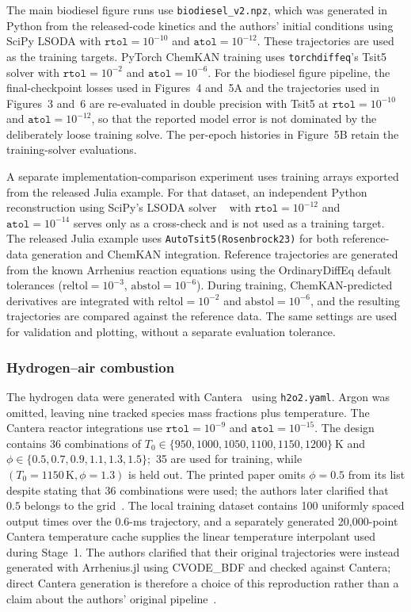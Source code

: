 \documentclass[11pt,a4paper]{article}
\begin{document}
The main biodiesel figure runs use \texttt{biodiesel\_v2.npz}, which was
generated in Python from the released-code kinetics and the authors' initial
conditions using SciPy LSODA with \(\texttt{rtol}=10^{-10}\) and
\(\texttt{atol}=10^{-12}\). These trajectories are used as the training
targets. PyTorch ChemKAN training uses \texttt{torchdiffeq}'s Tsit5 solver
with \(\texttt{rtol}=10^{-2}\) and \(\texttt{atol}=10^{-6}\). For the
biodiesel figure pipeline, the final-checkpoint losses used in Figures~4
and~5A and the trajectories used in Figures~3 and~6 are re-evaluated in
double precision with Tsit5 at \(\texttt{rtol}=10^{-10}\) and
\(\texttt{atol}=10^{-12}\), so that the reported model error is not dominated
by the deliberately loose training solve. The per-epoch histories in
Figure~5B retain the training-solver evaluations.

A separate implementation-comparison experiment uses training arrays exported
from the released Julia example. For that dataset, an independent Python
reconstruction using SciPy's LSODA solver
~\cite{virtanen2020scipy}
with \(\texttt{rtol}=10^{-12}\) and
\(\texttt{atol}=10^{-14}\) serves only as a cross-check and is not used as a
training target. The released Julia example uses
\texttt{AutoTsit5(Rosenbrock23)} for both reference-data
generation and ChemKAN integration. Reference trajectories
are generated from the known Arrhenius reaction equations
using the OrdinaryDiffEq default tolerances
($\mathrm{reltol}=10^{-3}$, $\mathrm{abstol}=10^{-6}$).
During training, ChemKAN-predicted derivatives are integrated
with $\mathrm{reltol}=10^{-2}$ and $\mathrm{abstol}=10^{-6}$,
and the resulting trajectories are compared against the
reference data. The same settings are used for validation
and plotting, without a separate evaluation tolerance.

\subsubsection{Hydrogen--air combustion}

The hydrogen data were generated with Cantera~\cite{cantera} using \texttt{h2o2.yaml}. Argon was omitted, leaving nine tracked species mass fractions plus temperature. The Cantera reactor integrations use \(\texttt{rtol}=10^{-9}\) and \(\texttt{atol}=10^{-15}\). The design contains 36 combinations of
$
T_0\in\{950,1000,1050,1100,1150,1200\}\ \mathrm{K}
$
and
$
\phi\in\{0.5,0.7,0.9,1.1,1.3,1.5\};
$
35 are used for training, while \((T_0=1150\,\mathrm{K},\phi=1.3)\) is held out. The printed paper omits \(\phi=0.5\) from its list despite stating that 36 combinations were used; the authors later clarified that \(0.5\) belongs to the grid~\cite{Koenig_2025,ChemKANAuthors2026}. The local training dataset contains 100 uniformly spaced output times over the \(0.6\)-ms trajectory, and a separately generated 20,000-point Cantera temperature cache supplies the linear temperature interpolant used during Stage~1. The authors clarified that their original trajectories were instead generated with Arrhenius.jl using CVODE\_BDF and checked against Cantera; direct Cantera generation is therefore a choice of this reproduction rather than a claim about the authors' original pipeline~\cite{ChemKANAuthors2026}.
\end{document}
